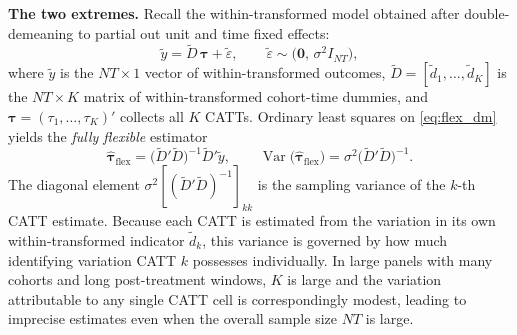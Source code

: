 \documentclass[12pt]{article}
\DeclareMathOperator{\Var}{Var}
\newcommand{\1}{\mathbbm{1}}
\newcommand{\ytd}{\tilde{y}}
\newcommand{\Dtd}{\tilde{D}}
\begin{document}
\noindent\textbf{The two extremes.}
Recall the within-transformed model obtained after double-demeaning to
partial out unit and time fixed effects:
\begin{equation}
  \ytd = \Dtd\,\bm{\tau} + \tilde{\varepsilon},
  \qquad
  \tilde{\varepsilon} \sim \bigl(\mathbf{0},\,\sigma^2 I_{NT}\bigr),
  \label{eq:flex_dm}
\end{equation}
where $\ytd$ is the $NT \times 1$ vector of within-transformed outcomes,
$\Dtd = [\tilde{d}_1, \ldots, \tilde{d}_K]$ is the $NT\times K$ matrix of
within-transformed cohort-time dummies, and $\bm{\tau} =
(\tau_1,\ldots,\tau_K)'$ collects all $K$ CATTs.
Ordinary least squares on \eqref{eq:flex_dm} yields the \emph{fully
flexible} estimator
\begin{equation}
  \hat{\bm{\tau}}_{\text{flex}}
  = \bigl(\Dtd'\Dtd\bigr)^{-1}\Dtd'\ytd,
  \qquad
  \Var\!\bigl(\hat{\bm{\tau}}_{\text{flex}}\bigr)
  = \sigma^2\bigl(\Dtd'\Dtd\bigr)^{-1}.
  \label{eq:flex_var}
\end{equation}
The diagonal element $\sigma^2[(\Dtd'\Dtd)^{-1}]_{kk}$ is the sampling
variance of the $k$-th CATT estimate.
Because each CATT is estimated from the variation in its own
within-transformed indicator $\tilde{d}_k$, this variance is governed
by how much identifying variation CATT $k$ possesses individually.
In large panels with many cohorts and long post-treatment windows, $K$
is large and the variation attributable to any single CATT cell is
correspondingly modest, leading to imprecise estimates even when the
overall sample size $NT$ is large.
\end{document}
